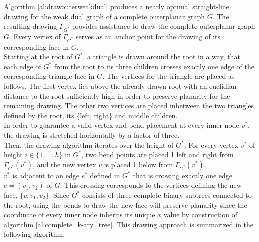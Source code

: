 Algorithm \ref{al:drawouterweakdual} produces a nearly optimal straight-line drawing for the weak dual graph of a complete outerplanar graph $G$. The resulting drawing $\Gamma_{G^*}$ provides assistance to draw the complete outerplanar graph $G$. Every vertex of $\Gamma_{G^*}$ serves as an anchor point for the drawing of its corresponding face in $G$.\\
Starting at the root of $G^*$, a triangle is drawn around the root in a way, that each edge of $G^*$ from the root to its three children crosses exactly one edge of the corresponding triangle face in $G$. The vertices for the triangle are placed as follows. The first vertex lies above the already drawn root with an euclidian distance to the root sufficiently high in order to preserve planarity for the remaining drawing. The other two vertices are placed inbetween the two triangles defined by the root, its $\{\text{left, right}\}$ and middle children.\\
In order to guarantee a valid vertex and bend placement at every inner node $v^*$, the drawing is stretched horizontally by a factor of three.\\
Then, the drawing algorithm iterates over the height of $G^*$. For every vertex $v^*$ of height $i\in \{1,...,h\}$ in $G^*$, two bend points are placed 1 \UL left and right from $\Gamma_{G^*}(v^*)$, and the new vertex $v$ is placed 1 \UL below from $\Gamma_{G^*}(v^*)$.\\
$v^*$ is adjacent to an edge $e^*$ defined in $G^*$ that is crossing exactly one edge $e = (v_1,v_2)$ of $G$. This crossing corresponds to the vertices defining the new face, $\{v, v_1, v_2\}$. Since $G^*$ consists of three complete binary subtrees connected to the root, using the bends to draw the new face will preserve planarity since the coordinate of every inner node inherits its unique $x$ value by construction of algorithm \ref{al:complete_k-ary_tree}. 
This drawing approach is summarized in the following algorithm.\\
